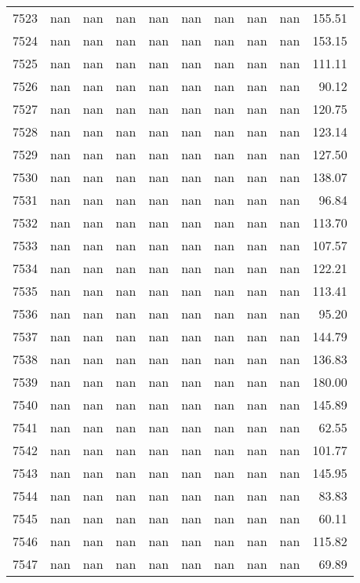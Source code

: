 \begin{tabular}{lrrrrrrrrr}
7523 & nan & nan & nan & nan & nan & nan & nan & nan & 155.51 \\
7524 & nan & nan & nan & nan & nan & nan & nan & nan & 153.15 \\
7525 & nan & nan & nan & nan & nan & nan & nan & nan & 111.11 \\
7526 & nan & nan & nan & nan & nan & nan & nan & nan & 90.12 \\
7527 & nan & nan & nan & nan & nan & nan & nan & nan & 120.75 \\
7528 & nan & nan & nan & nan & nan & nan & nan & nan & 123.14 \\
7529 & nan & nan & nan & nan & nan & nan & nan & nan & 127.50 \\
7530 & nan & nan & nan & nan & nan & nan & nan & nan & 138.07 \\
7531 & nan & nan & nan & nan & nan & nan & nan & nan & 96.84 \\
7532 & nan & nan & nan & nan & nan & nan & nan & nan & 113.70 \\
7533 & nan & nan & nan & nan & nan & nan & nan & nan & 107.57 \\
7534 & nan & nan & nan & nan & nan & nan & nan & nan & 122.21 \\
7535 & nan & nan & nan & nan & nan & nan & nan & nan & 113.41 \\
7536 & nan & nan & nan & nan & nan & nan & nan & nan & 95.20 \\
7537 & nan & nan & nan & nan & nan & nan & nan & nan & 144.79 \\
7538 & nan & nan & nan & nan & nan & nan & nan & nan & 136.83 \\
7539 & nan & nan & nan & nan & nan & nan & nan & nan & 180.00 \\
7540 & nan & nan & nan & nan & nan & nan & nan & nan & 145.89 \\
7541 & nan & nan & nan & nan & nan & nan & nan & nan & 62.55 \\
7542 & nan & nan & nan & nan & nan & nan & nan & nan & 101.77 \\
7543 & nan & nan & nan & nan & nan & nan & nan & nan & 145.95 \\
7544 & nan & nan & nan & nan & nan & nan & nan & nan & 83.83 \\
7545 & nan & nan & nan & nan & nan & nan & nan & nan & 60.11 \\
7546 & nan & nan & nan & nan & nan & nan & nan & nan & 115.82 \\
7547 & nan & nan & nan & nan & nan & nan & nan & nan & 69.89 \\

\end{tabular}

